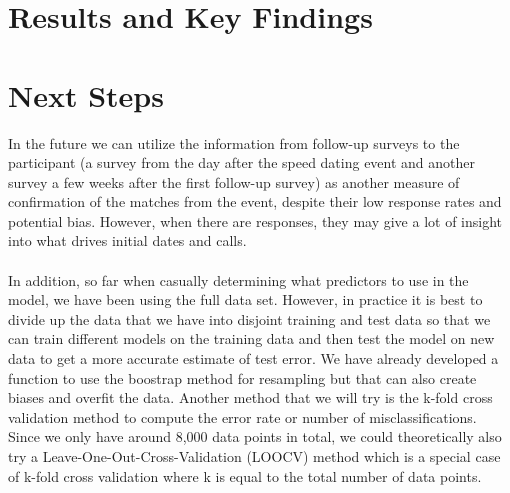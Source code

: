 \documentclass{article}
\begin{document}
\section{Results and Key Findings}

\section{Next Steps}
In the future we can utilize the information from follow-up surveys to the participant (a survey from the day after the speed dating event and another survey a few weeks after the first follow-up survey) as another measure of confirmation of the matches from the event, despite their low response rates and potential bias.  However, when there are responses, they may give a lot of insight into what drives initial dates and calls.\\
\null\\
In addition, so far when casually determining what predictors to use in the model, we have been using the full data set.  However, in practice it is best to divide up the data that we have into disjoint training and test data so that we can train different models on the training data and then test the model on new data to get a more accurate estimate of test error.  We have already developed a function to use the boostrap method for resampling but that can also create biases and overfit the data.  Another method that we will try is the k-fold cross validation method to compute the error rate or number of misclassifications.  Since we only have around 8,000 data points in total, we could theoretically also try a Leave-One-Out-Cross-Validation (LOOCV) method which is a special case of k-fold cross validation where k is equal to the total number of data points.\\
\end{document}
